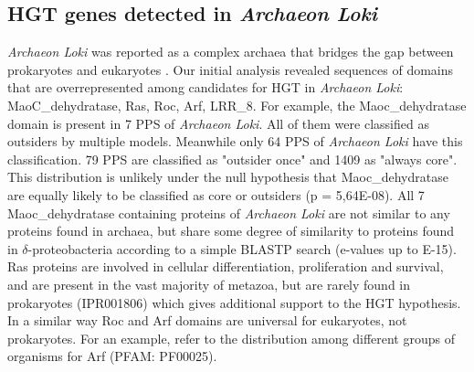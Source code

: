 \subsection{HGT genes detected in \textit{Archaeon Loki}} \textit{Archaeon
Loki} was reported as a complex archaea that bridges the gap between
prokaryotes and eukaryotes \cite{Spang2015}. Our initial analysis revealed
sequences of domains that are overrepresented among candidates for HGT in
\textit{Archaeon Loki}: MaoC\_dehydratase, Ras, Roc, Arf, LRR\_8. For example,
the Maoc\_dehydratase domain is present in 7 PPS of \textit{Archaeon Loki}. All
of them were classified as outsiders by multiple models. Meanwhile only 64 PPS
of \textit{Archaeon Loki} have this classification. 79 PPS are classified as
"outsider once" and 1409 as "always core". This distribution is unlikely under
the null hypothesis that Maoc\_dehydratase are equally likely to be classified
as core or outsiders (p = 5,64E-08). All 7 Maoc\_dehydratase containing proteins
of \textit{Archaeon Loki} are not similar to any proteins found in archaea, but
share some degree of similarity to proteins found in $\delta$-proteobacteria
according to a simple BLASTP search (e-values up to E-15). Ras proteins are
involved in cellular differentiation, proliferation and survival, and are
present in the vast majority of metazoa, but are rarely found in prokaryotes
(IPR001806) which gives additional support to the HGT hypothesis. In a similar
way Roc and Arf domains are universal for eukaryotes, not prokaryotes. For an
example, refer to the distribution among different groups of organisms for Arf
(PFAM: PF00025).
